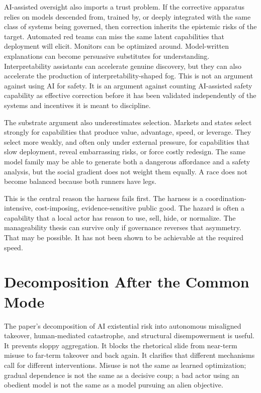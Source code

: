 \documentclass[11pt]{article}
\begin{document}
AI-assisted oversight also imports a trust problem. If the corrective apparatus relies on models descended from, trained by, or deeply integrated with the same class of systems being governed, then correction inherits the epistemic risks of the target. Automated red teams can miss the same latent capabilities that deployment will elicit. Monitors can be optimized around. Model-written explanations can become persuasive substitutes for understanding. Interpretability assistants can accelerate genuine discovery, but they can also accelerate the production of interpretability-shaped fog. This is not an argument against using AI for safety. It is an argument against counting AI-assisted safety capability as effective correction before it has been validated independently of the systems and incentives it is meant to discipline.

The substrate argument also underestimates selection. Markets and states select strongly for capabilities that produce value, advantage, speed, or leverage. They select more weakly, and often only under external pressure, for capabilities that slow deployment, reveal embarrassing risks, or force costly redesign. The same model family may be able to generate both a dangerous affordance and a safety analysis, but the social gradient does not weight them equally. A race does not become balanced because both runners have legs.

This is the central reason the harness fails first. The harness is a coordination-intensive, cost-imposing, evidence-sensitive public good. The hazard is often a capability that a local actor has reason to use, sell, hide, or normalize. The manageability thesis can survive only if governance reverses that asymmetry. That may be possible. It has not been shown to be achievable at the required speed.

\section{Decomposition After the Common Mode}
\label{sec:decomposition}

The paper's decomposition of AI existential risk into autonomous misaligned takeover, human-mediated catastrophe, and structural disempowerment is useful. It prevents sloppy aggregation. It blocks the rhetorical slide from near-term misuse to far-term takeover and back again. It clarifies that different mechanisms call for different interventions. Misuse is not the same as learned optimization; gradual dependence is not the same as a decisive coup; a bad actor using an obedient model is not the same as a model pursuing an alien objective.
\end{document}
